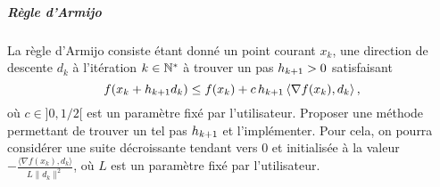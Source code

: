 \documentclass[a4paper,french,12pt]{article}
\begin{document}

\subparagraph{Règle d'Armijo} La règle d'Armijo consiste étant donné
un point courant $x_k$, une direction de descente $d_k$ à l'itération
$k \in \mathbb{N}^*$ à trouver un pas $h_{k+1} >0$ satisfaisant
\begin{equation*}
  f(x_{k} + h_{k+1} d_{k}) \leq f(x_{k}) 
+ c\, h_{k+1}\, \langle \nabla f(x_{k}),d_{k} \rangle \, , 
\end{equation*}
où $c \in ]0,1/2[$ est un paramètre fixé par l'utilisateur.  Proposer
une méthode permettant de trouver un tel pas $h_{k+1}$ et
l'implémenter. Pour cela, on pourra considérer une suite décroissante
tendant vers $0$ et initialisée à la valeur
$-\frac{\langle \nabla f(x_{k}),d_{k} \rangle}{L \|d_{k}\|^2}$, où $L$
est un paramètre fixé par l'utilisateur. 
\end{document}
